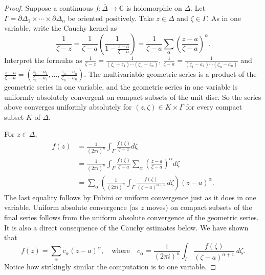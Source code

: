 \documentclass[12pt,openany]{book}
\newcommand{\C}{{\mathbb{C}}}
\theoremstyle{plain}
\theoremstyle{remark}
\theoremstyle{definition}
\theoremstyle{exercise}
\theoremstyle{example}
\begin{document}
\begin{proof}
Suppose a continuous $f \colon \overline{\Delta} \to \C$ is holomorphic on $\Delta$.
Let
$\Gamma = \partial \Delta_1 \times \cdots \times \partial \Delta_n$
be oriented positively.
Take $z \in \Delta$ and $\zeta \in \Gamma$.
As in one variable, write the Cauchy kernel as
\begin{equation*}
\frac{1}{\zeta-z} =
\frac{1}{\zeta-a}
\left(
\frac{1}{1-\frac{z-a}{\zeta-a}}
\right)
=
\frac{1}{\zeta-a}
\sum_{\alpha}
{\left(\frac{z-a}{\zeta-a}\right)}^\alpha .
\end{equation*}
Interpret the formulas as
$\frac{1}{\zeta-z} = \frac{1}{(\zeta_1-z_1) \cdots (\zeta_n-z_n)}$,
$\frac{1}{\zeta-a} = \frac{1}{(\zeta_1-a_1) \cdots (\zeta_n-a_n)}$
and
$\frac{z-a}{\zeta-a} =
\left(
\frac{z_1-a_1}{\zeta_1-a_1}, \ldots,
\frac{z_n-a_n}{\zeta_n-a_n}
\right)$.
The multivariable geometric series is a product of the geometric series
in one variable, and the geometric series in one variable
is uniformly absolutely convergent on compact subsets of the unit disc.
So the series
above converges uniformly absolutely for $(z,\zeta) \in K \times \Gamma$
for every compact subset $K$ of $\Delta$.

For $z \in \Delta$,
\begin{equation*}
\begin{split}
f(z)
& =
\frac{1}{{(2\pi i)}^n}
\int_{\Gamma}
\frac{f(\zeta)}{\zeta-z}
d \zeta
\\
& =
\frac{1}{{(2\pi i)}^n}
\int_{\Gamma}
\frac{f(\zeta)}{\zeta-a}
\sum_{\alpha}
{\left(\frac{z-a}{\zeta-a}\right)}^{\alpha}
d \zeta
\\
& =
\sum_{\alpha}
\left(
\frac{1}{{(2\pi i)}^n}
\int_{\Gamma}
\frac{f(\zeta)}{{(\zeta-a)}^{\alpha+1}}
\,
d \zeta
\right)
{(z-a)}^{\alpha} .
\end{split}
\end{equation*}
The last equality follows by Fubini or uniform convergence just as it does in one variable.
Uniform absolute convergence (as $z$ moves) on compact subsets of the final
series follows from the
uniform absolute convergence of the geometric series.  It is also a direct
consequence of the Cauchy estimates below.
We have shown that
\begin{equation*}
f(z) =
\sum_{\alpha}
c_{\alpha}
{(z-a)}^{\alpha} ,
\quad \text{where} \quad
c_\alpha
=
\frac{1}{{(2\pi i)}^n}
\int_{\Gamma}
\frac{f(\zeta)}{{(\zeta-a)}^{\alpha+1}}
\,
d \zeta .
\end{equation*}
Notice how strikingly similar the computation is to one variable.


\end{proof}
\end{document}
